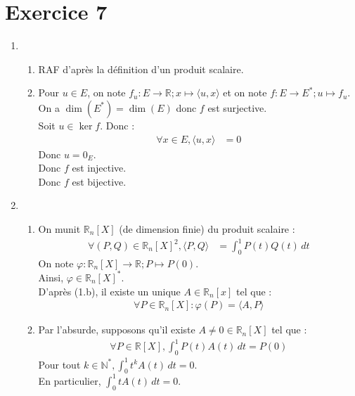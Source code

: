 \documentclass[../main.tex]{subfiles}
\begin{document}
\section*{Exercice 7}
\begin{enumerate}
    \item \begin{enumerate}
        \item RAF d'après la définition d'un produit scalaire. 
        \item Pour $u\in E$, on note $f_u:E\to \mathbb{R}; x\mapsto \langle u, x\rangle$ et on note $f:E\to E^*; u\mapsto f_u$. \\
        On a $\dim(E^*) = \dim(E)$ donc $f$ est surjective. \\
        Soit $u\in\ker f$. Donc : 
        \begin{align*}
            \forall x\in E, \langle u, x\rangle &= 0
        \end{align*}
        Donc $u = 0_E$. \\
        Donc $f$ est injective. \\
        Donc $f$ est bijective. 
    \end{enumerate}
    \item \begin{enumerate}
        \item On munit $\mathbb{R}_n[X]$ (de dimension finie) du produit scalaire : 
        \begin{align*}
            \forall (P, Q)\in \mathbb{R}_n[X]^2, \langle P, Q\rangle &= \int_{0}^{1} P(t) Q(t) \,dt
        \end{align*}
        On note $\varphi:\mathbb{R}_n[X]\to \mathbb{R}; P\mapsto P(0)$. \\
        Ainsi, $\varphi\in \mathbb{R}_n[X]^*$. \\
        D'après (1.b), il existe un unique $A\in \mathbb{R}_n[x]$ tel que :
        \begin{align*}
            \forall P\in \mathbb{R}_n[X]: \varphi(P) = \langle A, P\rangle
        \end{align*}
        \item Par l'absurde, supposons qu'il existe $A\neq 0\in \mathbb{R}_n[X]$ tel que : 
        \begin{align*}
            \forall P\in \mathbb{R}[X], \int_{0}^{1} P(t) A(t) \,dt = P(0)
        \end{align*}
        Pour tout $k\in \mathbb{N}^*, \int_{0}^{1} t^k A(t) \,dt = 0$. \\
        En particulier, $\int_{0}^{1} t A(t) \,dt = 0$. \\

\end{enumerate}
\end{enumerate}
\end{document}
